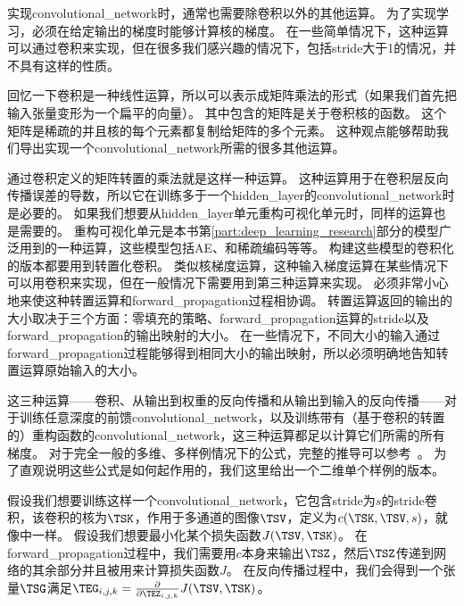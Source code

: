  
实现\gls{convolutional_network}时，通常也需要除卷积以外的其他运算。
为了实现学习，必须在给定输出的梯度时能够计算核的梯度。
在一些简单情况下，这种运算可以通过卷积来实现，但在很多我们感兴趣的情况下，包括\gls{stride}大于1的情况，并不具有这样的性质。

回忆一下卷积是一种线性运算，所以可以表示成矩阵乘法的形式（如果我们首先把输入张量变形为一个扁平的向量）。
其中包含的矩阵是关于卷积核的函数。
这个矩阵是稀疏的并且核的每个元素都复制给矩阵的多个元素。
这种观点能够帮助我们导出实现一个\gls{convolutional_network}所需的很多其他运算。

通过卷积定义的矩阵转置的乘法就是这样一种运算。
这种运算用于在卷积层反向传播误差的导数，所以它在训练多于一个\gls{hidden_layer}的\gls{convolutional_network}时是必要的。
如果我们想要从\gls{hidden_layer}单元重构可视化单元时，同样的运算也是需要的\citep{Simard92-short}。
重构可视化单元是本书第\ref{part:deep_learning_research}部分的模型广泛用到的一种运算，这些模型包括\gls{AE}、和稀疏编码等等。
构建这些模型的卷积化的版本都要用到转置化卷积。
类似核梯度运算，这种输入梯度运算在某些情况下可以用卷积来实现，但在一般情况下需要用到第三种运算来实现。%
必须非常小心地来使这种转置运算和\gls{forward_propagation}过程相协调。
转置运算返回的输出的大小取决于三个方面：零填充的策略、\gls{forward_propagation}运算的\gls{stride}以及\gls{forward_propagation}的输出映射的大小。
在一些情况下，不同大小的输入通过\gls{forward_propagation}过程能够得到相同大小的输出映射，所以必须明确地告知转置运算原始输入的大小。

这三种运算——卷积、从输出到权重的反向传播和从输出到输入的反向传播——对于训练任意深度的前馈\gls{convolutional_network}，以及训练带有（基于卷积的转置的）重构函数的\gls{convolutional_network}，这三种运算都足以计算它们所需的所有梯度。
对于完全一般的多维、多样例情况下的公式，完整的推导可以参考~\cite{Goodfellow-TR2010}。 
为了直观说明这些公式是如何起作用的，我们这里给出一个二维单个样例的版本。
 
 
假设我们想要训练这样一个\gls{convolutional_network}，它包含\gls{stride}为$s$的\gls{stride}卷积，该卷积的核为$\TSK$，作用于多通道的图像$\TSV$，定义为$c(\TSK, \TSV, s)$，就像中一样。
假设我们想要最小化某个损失函数$J(\TSV, \TSK)$。
在\gls{forward_propagation}过程中，我们需要用$c$本身来输出$\TSZ$，然后$\TSZ$传递到网络的其余部分并且被用来计算损失函数$J$。
在反向传播过程中，我们会得到一个张量$\TSG$满足$\TEG_{i, j, k} = \frac{\partial}{\partial \TEZ_{i, j, k}} J(\TSV, \TSK)$。

